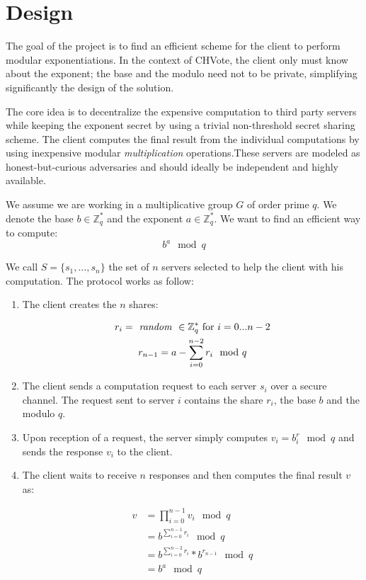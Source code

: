 \documentclass[]{article}
\newcommand{\ZZ}{\ensuremath{\mathbb{Z}}}
\begin{document}
\section{Design} \label{design}

The goal of the project is to find an efficient scheme for the client to perform
modular exponentiations. In the context of CHVote, the client only must know
about the exponent; the base and the modulo need not to be private, simplifying
significantly the design of the solution.

The core idea is to decentralize the expensive computation to third party
servers while keeping the exponent secret by using a trivial non-threshold
secret sharing scheme. The client computes the final result from the individual
computations by using inexpensive modular \textit{multiplication}
operations.These servers are modeled as honest-but-curious adversaries and
should ideally be independent and highly available.


We assume we are working in a multiplicative group $G$ of order prime $q$. We denote
the base $b \in \ZZ_q^*$ and the exponent $a \in \ZZ_q^*$. We want to find an
efficient way to compute: $$ b^a \mod q $$

We call $S = \{s_1,\dots,s_n\}$ the set of $n$ servers selected to help
the client with his computation. The protocol works as follow:

\begin{enumerate}

    \item The client creates the $n$ shares:

        \begin{gather}
            \nonumber r_i = \text{\textit{ random }} \in \ZZ_q^* \text{  for } i=0...n-2\\
            \nonumber r_{n-1} = {a - \sum_{i=0}^{n-2} r_i} \mod q
        \end{gather}

    \item The client sends a computation request to each server $s_i$ over a
        secure channel. The request sent to server $i$ contains the share $r_i$,
        the base $b$ and the modulo $q$.
    \item Upon reception of a request, the server simply computes $ v_i = b^r_i
        \mod q$ and sends the response $v_i$ to the client.
    \item The client waits to receive $n$ responses and then computes the final
        result $v$ as: 

        \begin{align}
          \nonumber v &= \prod_{i=0}^{n-1} {v_i \mod q}\\
          \nonumber   &= b^{\sum_{i=0}^{n-1} r_i} \mod q\\
          \nonumber   &= b^{\sum_{i=0}^{n-2} r_i} * b^{r_{n-1}} \mod q\\
          \nonumber   &= b^a \mod q
        \end{align}

\end{enumerate}
\end{document}
